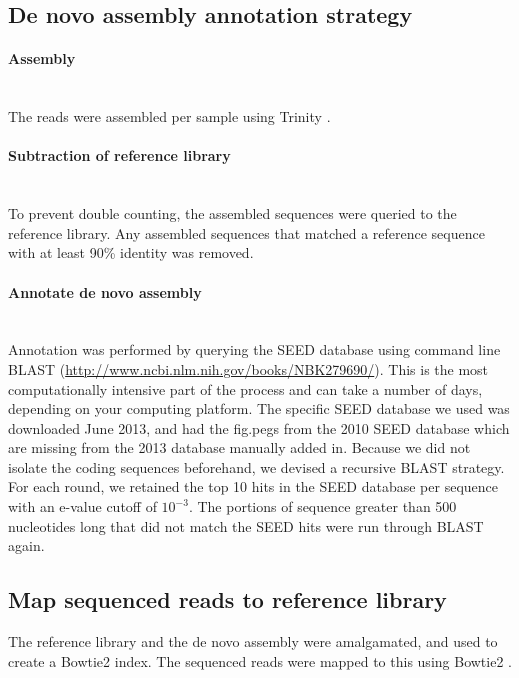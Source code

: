 \subsection{De novo assembly annotation strategy}

\paragraph{Assembly}\mbox{}\\
The reads were assembled per sample using Trinity \cite{haas2013novo}.

\paragraph{Subtraction of reference library}\mbox{}\\
To prevent double counting, the assembled sequences were queried to the reference library. Any assembled sequences that matched a reference sequence with at least 90\% identity was removed.

\paragraph{Annotate de novo assembly}\mbox{}\\
Annotation was performed by querying the SEED database \cite{overbeek2005subsystems} using command line BLAST (\url{http://www.ncbi.nlm.nih.gov/books/NBK279690/}). This is the most computationally intensive part of the process and can take a number of days, depending on your computing platform. The specific SEED database we used was downloaded June 2013, and had the fig.pegs from the 2010 SEED database which are missing from the 2013 database manually added in. Because we did not isolate the coding sequences beforehand, we devised a recursive BLAST strategy. For each round, we retained the top 10 hits in the SEED database per sequence with an e-value cutoff of $10^{-3}$. The portions of sequence greater than 500 nucleotides long that did not match the SEED hits were run through BLAST again.

\subsection{Map sequenced reads to reference library}
The reference library and the de novo assembly were amalgamated, and used to create a Bowtie2 index. The sequenced reads were mapped to this using Bowtie2 \cite{langmead2012fast}.

